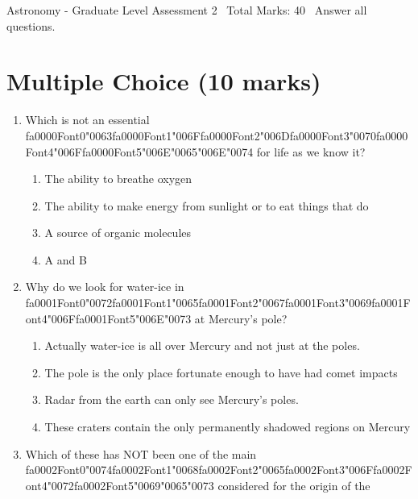 \documentclass[12pt]{article}
\begin{document}
\begin{center}
Astronomy - Graduate Level Assessment 2 \
Total Marks: 40 \
Answer all questions.
\end{center}

\section*{Multiple Choice (10 marks)}
\begin{enumerate}[label=\arabic*.]
\item Which is not an essential {\csname fa0000Font0\endcsname\char"0063}{\csname fa0000Font1\endcsname\char"006F}{\csname fa0000Font2\endcsname\char"006D}{\csname fa0000Font3\endcsname\char"0070}{\csname fa0000Font4\endcsname\char"006F}{\csname fa0000Font5\endcsname\char"006E}{\char"0065}{\char"006E}{\char"0074} for life as we know it?
\begin{enumerate}[label=(\alph*)]
    \item The ability to breathe oxygen
    \item The ability to make energy from sunlight or to eat things that do
    \item A source of organic molecules
    \item A and B
\end{enumerate}
\item Why do we look for water-ice in {\csname fa0001Font0\endcsname\char"0072}{\csname fa0001Font1\endcsname\char"0065}{\csname fa0001Font2\endcsname\char"0067}{\csname fa0001Font3\endcsname\char"0069}{\csname fa0001Font4\endcsname\char"006F}{\csname fa0001Font5\endcsname\char"006E}{\char"0073} at Mercury's pole?
\begin{enumerate}[label=(\alph*)]
    \item Actually water-ice is all over Mercury and not just at the poles.
    \item The pole is the only place fortunate enough to have had comet impacts
    \item Radar from the earth can only see Mercury's poles.
    \item These craters contain the only permanently shadowed regions on Mercury
\end{enumerate}
\item Which of these has NOT been one of the main {\csname fa0002Font0\endcsname\char"0074}{\csname fa0002Font1\endcsname\char"0068}{\csname fa0002Font2\endcsname\char"0065}{\csname fa0002Font3\endcsname\char"006F}{\csname fa0002Font4\endcsname\char"0072}{\csname fa0002Font5\endcsname\char"0069}{\char"0065}{\char"0073} considered for the origin of the

\end{enumerate}
\end{document}

